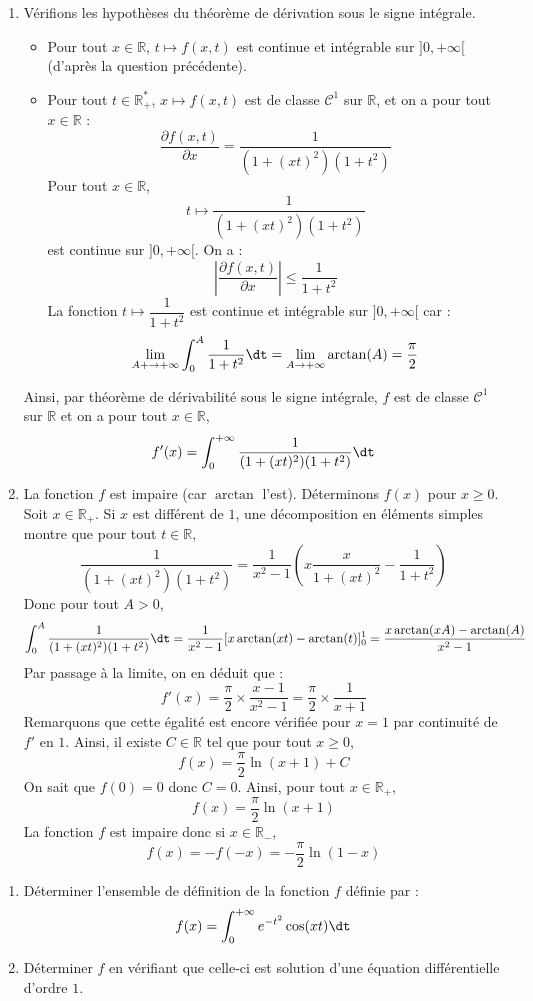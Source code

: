 \documentclass[a4paper,10pt]{report}
\begin{document}
\begin{enumerate}
\noindent Finalement, $f$ est définie sur $\mathbb{R}$.
\item Vérifions les hypothèses du théorème de dérivation sous le signe intégrale.
\begin{itemize}
\item Pour tout $x \in \mathbb{R}$, $t \mapsto f(x,t)$ est continue et intégrable sur $]0, + \infty[$ (d'après la question précédente).
\item Pour tout $t \in \mathbb{R}_+^{*}$, $x \mapsto f(x,t)$ est de classe $\mathcal{C}^1$ sur $\mathbb{R}$, et on a pour tout $x \in \mathbb{R}$ :
$$ \dfrac{\partial f(x,t)}{\partial x} = \dfrac{1}{(1+(xt)^2)(1+t^2)}$$
Pour tout $x \in \mathbb{R}$,
$$ t \mapsto \dfrac{1}{(1+(xt)^2)(1+t^2)}$$
est continue sur $]0,+ \infty[$. On a :
$$ \left\vert \dfrac{\partial f(x,t)}{\partial x} \right\vert \leq \dfrac{1}{1+t^2}$$
La fonction $t \mapsto \dfrac{1}{1+t^2}$ est continue et intégrable sur $]0, + \infty[$ car :
$$ \lim_{A + \rightarrow + \infty} \int_{0}^A \dfrac{1}{1+t^2} \dt = \lim_{A \rightarrow + \infty} \arctan(A) = \dfrac{\pi}{2}$$
\end{itemize}
Ainsi, par théorème de dérivabilité sous le signe intégrale, $f$ est de classe $\mathcal{C}^1$ sur $\mathbb{R}$ et on a pour tout $x \in \mathbb{R}$,
$$ f'(x) = \int_{0}^{+ \infty} \dfrac{1}{(1+(xt)^2)(1+t^2)} \dt$$
\item La fonction $f$ est impaire (car $\arctan$ l'est). Déterminons $f(x)$ pour $x \geq 0$. Soit $x \in \mathbb{R}_+$. Si $x$ est différent de $1$, une décomposition en éléments simples montre que pour tout $t \in \mathbb{R}$,
$$ \dfrac{1}{(1+(xt)^2)(1+t^2)} = \dfrac{1}{x^2-1} \left( x\dfrac{x}{1+(xt)^2} - \dfrac{1}{1+t^2} \right)$$
Donc pour tout $A>0$,
$$ \int_{0}^A \dfrac{1}{(1+(xt)^2)(1+t^2)} \dt = \dfrac{1}{x^2-1} [ x \arctan(xt)- \arctan(t) ]_0^1 = \dfrac{x\arctan(xA) - \arctan(A)}{x^2-1}$$
Par passage à la limite, on en déduit que :
$$ f'(x) = \dfrac{\pi}{2} \times \dfrac{x-1}{x^2-1} = \dfrac{\pi}{2} \times \dfrac{1}{x+1}$$
Remarquons que cette égalité est encore vérifiée pour $x=1$ par continuité de $f'$ en $1$. Ainsi, il existe $C \in \mathbb{R}$ tel que pour tout $x \geq 0$,
$$ f(x) = \dfrac{\pi}{2} \ln(x+1) + C$$
On sait que $f(0)=0$ donc $C=0$. Ainsi, pour tout $x \in \mathbb{R}_+$,
$$ f(x) = \dfrac{\pi}{2} \ln(x+1) $$
La fonction $f$ est impaire donc si $x \in \mathbb{R}_{-}$,
$$ f(x) = - f(-x) = -\dfrac{\pi}{2} \ln(1-x)$$
\end{enumerate}


\begin{Exercice}{}
\begin{enumerate}
\item Déterminer l'ensemble de définition de la fonction $f$ définie par :
$$ f(x) = \int_{0}^{+ \infty} e^{-t^2} \cos(xt) \dt$$
\item Déterminer $f$ en vérifiant que celle-ci est solution d'une équation différentielle d'ordre $1$.
\end{enumerate}
\end{Exercice}
\end{document}
